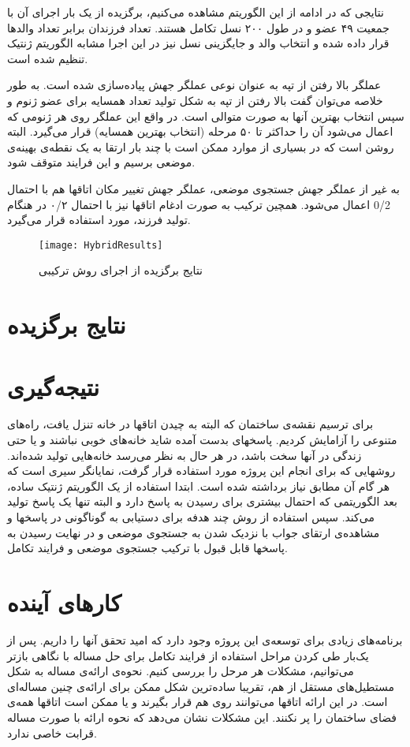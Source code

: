 \documentclass{report}
\begin{document}
نتایجی که در ادامه از این الگوریتم مشاهده می‌کنیم، برگزیده از یک بار اجرای آن با جمعیت ۴۹ عضو و در طول ۲۰۰ نسل تکامل هستند. تعداد فرزندان برابر تعداد والدها قرار داده شده و انتخاب والد و جایگزینی نسل نیز در این اجرا مشابه الگوریتم ژنتیک تنظیم شده است.

عملگر بالا رفتن از تپه به عنوان نوعی عملگر جهش پیاده‌سازی شده است. به طور خلاصه می‌توان گفت بالا رفتن از تپه به شکل تولید تعداد همسایه برای عضو ژنوم و سپس انتخاب بهترین آنها به صورت متوالی است. در واقع این عملگر روی هر ژنومی که اعمال می‌شود آن را حداکثر تا ۵۰ مرحله (انتخاب بهترین همسایه) قرار می‌گیرد. البته روشن است که در بسیاری از موارد ممکن است با چند بار ارتقا به یک نقطه‌ی بهینه‌ی موضعی برسیم و این فرایند متوقف شود.

به غیر از عملگر جهش جستجوی موضعی، عملگر جهش تغییر مکان اتاقها هم با احتمال 0/2 اعمال می‌شود. همچین ترکیب به صورت ادغام اتاقها نیز با احتمال ۰/۲ در هنگام تولید فرزند، مورد استفاده قرار می‌گیرد.

\begin{figure} \centerline{\texttt{[image: HybridResults]}} \caption{\label{fHybridResults}
نتایج برگزیده از اجرای روش ترکیبی
} \end{figure}

\section{نتایج برگزیده}

\section{نتیجه‌گیری}
برای ترسیم نقشه‌ی ساختمان که البته به چیدن اتاقها در خانه تنزل یافت، راه‌های متنوعی را آزامایش کردیم. پاسخهای بدست آمده شاید خانه‌های خوبی نباشند و یا حتی زندگی در آنها سخت باشد، در هر حال به نظر می‌رسد خانه‌هایی تولید شده‌اند. روشهایی که برای انجام این پروژه مورد استفاده قرار گرفت، نمایانگر سیری است که هر گام آن مطابق نیاز برداشته شده است. ابتدا استفاده از یک الگوریتم ژنتیک ساده، بعد الگوریتمی که احتمال بیشتری برای رسیدن به پاسخ دارد و البته تنها یک پاسخ تولید می‌کند. سپس استفاده از روش چند هدفه برای دستیابی به گوناگونی در پاسخها و مشاهده‌ی ارتقای جواب با نزدیک شدن به جستجوی موضعی و در نهایت رسیدن به پاسخها قابل قبول با ترکیب جستجوی موضعی و فرایند تکامل.
   
\section{کارهای آینده}
برنامه‌های زیادی برای توسعه‌ی این پروژه وجود دارد که امید تحقق آنها را داریم. پس از یک‌بار طی کردن مراحل استفاده از فرایند تکامل برای حل مساله با نگاهی بازتر می‌توانیم، مشکلات هر مرحل را بررسی کنیم. نحوه‌ی ارائه‌ی مساله به شکل مستطیل‌های مستقل از هم، تقریبا ساده‌ترین شکل ممکن برای ارائه‌ی چنین مساله‌ای است. در این ارائه اتاقها می‌توانند روی هم قرار بگیرند و یا ممکن است اتاقها همه‌ی فضای ساختمان را پر نکنند. این مشکلات نشان می‌دهد که نحوه ارائه با صورت مساله قرابت خاصی ندارد.
\end{document}
